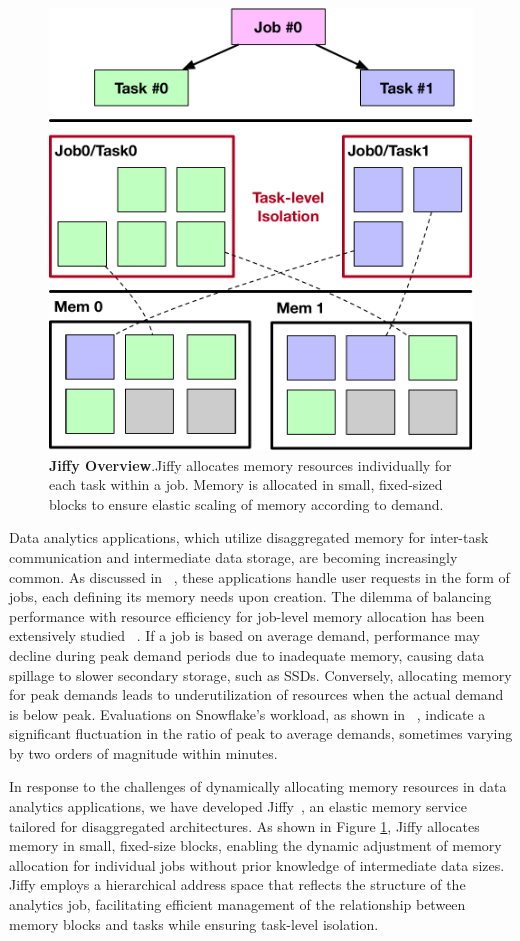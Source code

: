 \begin{figure}[t]
    \centering
    \includegraphics[width=0.6\columnwidth]{fig/jiffy/Jiffy.pdf}
    \caption[Jiffy overview]{\textbf{Jiffy Overview}.Jiffy allocates memory resources individually for each task within a job. Memory is allocated in small, fixed-sized blocks to ensure elastic scaling of memory according to demand.} 
    \label{fig:jiffy}
  \end{figure}
Data analytics applications, which utilize disaggregated memory for inter-task communication and intermediate data storage, are becoming increasingly common. As discussed in ~\cite{starling, shuffling, pocket, cirrus}, these applications handle user requests in the form of jobs, each defining its memory needs upon creation. The dilemma of balancing performance with resource efficiency for job-level memory allocation has been extensively studied ~\cite{elasticquery, qoop}. If a job is based on average demand, performance may decline during peak demand periods due to inadequate memory, causing data spillage to slower secondary storage, such as SSDs. Conversely, allocating memory for peak demands leads to underutilization of resources when the actual demand is below peak. Evaluations on Snowflake's workload, as shown in ~\cite{elasticquery}, indicate a significant fluctuation in the ratio of peak to average demands, sometimes varying by two orders of magnitude within minutes.

In response to the challenges of dynamically allocating memory resources in data analytics applications, we have developed Jiffy~\cite{jiffy}, an elastic memory service tailored for disaggregated architectures. As shown in Figure \ref{fig:jiffy}, Jiffy allocates memory in small, fixed-size blocks, enabling the dynamic adjustment of memory allocation for individual jobs without prior knowledge of intermediate data sizes. Jiffy employs a hierarchical address space that reflects the structure of the analytics job, facilitating efficient management of the relationship between memory blocks and tasks while ensuring task-level isolation.

